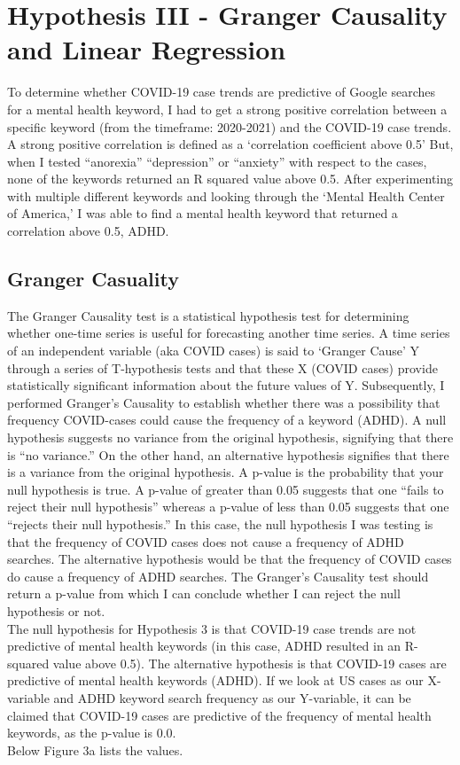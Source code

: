 \documentclass{article}
\begin{document}
\section{Hypothesis III - Granger Causality and Linear Regression}
To determine whether COVID-19 case trends are predictive of Google searches for a mental health
keyword, I had to get a strong positive correlation between a specific keyword (from the timeframe:
2020-2021) and the COVID-19 case trends. A strong positive correlation is defined as a ‘correlation
coefficient above 0.5’ But, when I tested “anorexia” “depression” or “anxiety” with respect to the cases,
none of the keywords returned an R squared value above 0.5. After experimenting with multiple
different keywords and looking through the ‘Mental Health Center of America,’ I was able to find a mental
health keyword that returned a correlation above 0.5, ADHD.

\subsection{Granger Casuality}

The Granger Causality test is a statistical hypothesis test for determining whether one-time series is
useful for forecasting another time series. A time series of an independent variable (aka COVID
cases) is said to ‘Granger Cause’ Y through a series of T-hypothesis tests and that these X (COVID
cases) provide statistically significant information about the future values of Y. Subsequently, I
performed Granger’s Causality to establish whether there was a possibility that frequency
COVID-cases could cause the frequency of a keyword (ADHD). A null hypothesis suggests no
variance from the original hypothesis, signifying that there is “no variance.” On the other hand, an
alternative hypothesis signifies that there is a variance from the original hypothesis. A p-value is the
probability that your null hypothesis is true. A p-value of greater than 0.05 suggests that one “fails to
reject their null hypothesis” whereas a p-value of less than 0.05 suggests that one “rejects their null
hypothesis.” In this case, the null hypothesis I was testing is that the frequency of COVID cases does
not cause a frequency of ADHD searches. The alternative hypothesis would be that the frequency of
COVID cases do cause a frequency of ADHD searches. The Granger’s Causality test should return
a p-value from which I can conclude whether I can reject the null hypothesis or not.
\\
The null hypothesis for Hypothesis 3 is that COVID-19 case trends are not predictive of mental health
keywords (in this case, ADHD resulted in an R-squared value above 0.5). The alternative hypothesis is
that COVID-19 cases are predictive of mental health keywords (ADHD). If we look at US cases as our
X-variable and ADHD keyword search frequency as our Y-variable, it can be claimed that COVID-19
cases are predictive of the frequency of mental health keywords, as the p-value is 0.0.
\\
\noindent Below Figure 3a lists the values.
\end{document}
